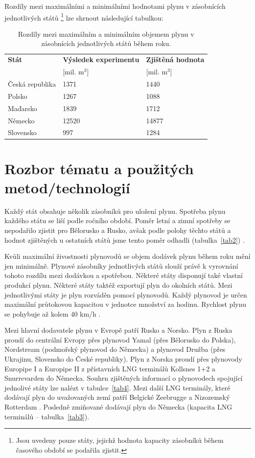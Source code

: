 \documentclass[a4paper,12pt]{article}
\begin{document}
  Rozdíly mezi maximálními a minimálními hodnotami plynu v zásobnících jednotlivých států
  \footnote{Jsou uvedeny pouze státy, jejichž hodnota kapacity zásobníků během časového období se podařila zjistit.} lze shrnout následující tabulkou:
  
  \begin{table}[h!]
  \centering
  \begin{tabular}{| l | l | l |}
    \hline
    \textbf{Stát} & \textbf{Výsledek experimentu} & \textbf{Zjištěná hodnota} \\
    & [mil. m$^3$] & [mil. m$^3$] \\
    \hline\hline
    Česká republika & 1371 & 1440 \\ \hline
    Polsko & 1267 & 1088 \\ \hline
    Maďarsko & 1839 & 1712 \\ \hline
    Německo & 12520 & 14877 \\ \hline
    Slovensko & 997 &  1284 \\
    \hline
  \end{tabular}
  \caption{Rozdíly mezi maximálním a minimálním objemem plynu v zásobnících jednotlivých států během roku.}
  \end{table}
  
  \section{Rozbor tématu a použitých metod/technologií}
  Každý stát obsahuje několik zásobníků pro uložení plynu. Spotřeba plynu každého státu se liší podle ročního období. 
  Poměr letní a zimní spotřeby se nepodařilo zjistit pro Bělorusko a Rusko, avšak podle polohy těchto států a 
  hodnot zjištěných u ostatních států jsme tento poměr odhadli (tabulka~\ref{tab2}) \cite{mapa1}.
  
  Kvůli maximální živostnosti plynovodů se objem dodávek plynu během roku mění jen minimálně. Plynové zásobníky 
  jednotlivých států slouží právě k vyrovnání tohoto rozdílu mezi dodávkou a spotřebou. Některé státy disponují 
  také vlastní produkcí plynu. Některé státy taktéž exportují plyn do okolních států. Mezi jednotlivými státy 
  je plyn rozváděn pomocí plynovodů. Každý plynovod je určen maximální průtokovou kapacitou v jednotce množství 
  za hodinu. Rychlost plynu se pohybuje až kolem 40 km/h \cite{speed}.
  
  Mezi hlavní dodavatele plynu v Evropě patří Rusko a Norsko. Plyn z Ruska proudí do centrální Evropy přes 
  plynovod Yamal (přes Bělorusko do Polska), Nordstream (podmořský plynovod do Německa) a plynovod Družba 
  (přes Ukrajinu, Slovensko do České republiky). Plyn z Norska proudí přes plynovody Europipe I a Europipe II 
  z přístavních LNG terminálů Kollsnes 1+2 \cite{kollsnes} a Snurrevarden do Německa. Souhrn zjištěných informací o plynovodech 
  spojující jednolivé státy lze nalézt v tabulce~\ref{tab4}. Mezi další LNG terminály, které dodávají 
  plyn do uvažovaných zemí patří Belgické Zeebrugge \cite{zeebrugge} a Nizozemský Rotterdam \cite{rotterdam}. 
  Posledně zmiňované dodávají plyn do Německa (kapacita LNG terminálů -- tabulka~\ref{tab3}).
  
\end{document}
